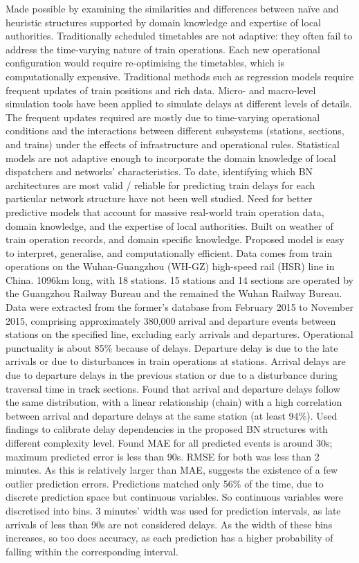 \documentclass{article}
\begin{document}
Made possible by examining the similarities and differences between naïve and heuristic structures supported by domain knowledge and expertise of local authorities. 
Traditionally scheduled timetables are not adaptive: they often fail to address the time-varying nature of train operations. Each new operational configuration would require re-optimising the timetables, which is computationally expensive. 
Traditional methods such as regression models require frequent updates of train positions and rich data. Micro- and macro-level simulation tools have been applied to simulate delays at different levels of details. 
The frequent updates required are mostly due to time-varying operational conditions and the interactions between different subsystems (stations, sections, and trains) under the effects of infrastructure and operational rules.
Statistical models are not adaptive enough to incorporate the domain knowledge of local dispatchers and networks’ characteristics. 
To date, identifying which BN architectures are most valid / reliable for predicting train delays for each particular network structure have not been well studied. 
Need for better predictive models that account for massive real-world train operation data, domain knowledge, and the expertise of local authorities. Built on weather of train operation records, and domain specific knowledge. Proposed model is easy to interpret, generalise, and computationally efficient. 
Data comes from train operations on the Wuhan-Guangzhou (WH-GZ) high-speed rail (HSR) line in China. 1096km long, with 18 stations. 15 stations and 14 sections are operated by the Guangzhou Railway Bureau and the remained the Wuhan Railway Bureau. Data were extracted from the former’s database from February 2015 to November 2015, comprising approximately 380,000 arrival and departure events between stations on the specified line, excluding early arrivals and departures. Operational punctuality is about 85\% because of delays.
Departure delay is due to the late arrivals or due to disturbances in train operations at stations. Arrival delays are due to departure delays in the previous station or due to a disturbance during traversal time in track sections. 
Found that arrival and departure delays follow the same distribution, with a linear relationship (chain) with a high correlation between arrival and departure delays at the same station (at least 94\%). Used findings to calibrate delay dependencies in the proposed BN structures with different complexity level.
Found MAE for all predicted events is around 30s; maximum predicted error is less than 90s. RMSE for both was less than 2 minutes. As this is relatively larger than MAE, suggests the existence of a few outlier prediction errors. Predictions matched only 56\% of the time, due to discrete prediction space but continuous variables. So continuous variables were discretised into bins. 3 minutes’ width was used for prediction intervals, as late arrivals of less than 90s are not considered delays. As the width of these bins increases, so too does accuracy, as each prediction has a higher probability of falling within the corresponding interval. 
\end{document}
